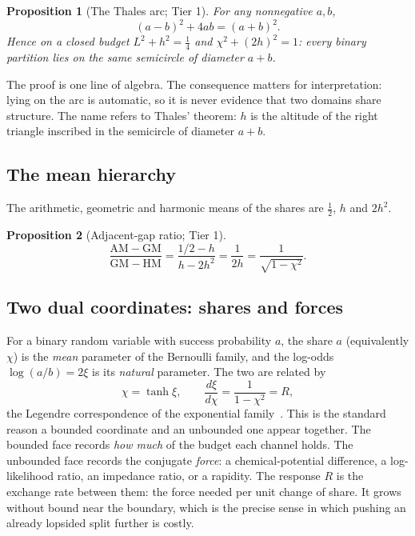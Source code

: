 \documentclass[11pt]{article}
\newtheorem{proposition}{Proposition}
\theoremstyle{definition}
\theoremstyle{remark}
\begin{document}
\begin{proposition}[The Thales arc; Tier 1]\label{prop:arc}
For any nonnegative $a,b$,
\begin{equation}\label{eq:circle}
(a-b)^2+4ab=(a+b)^2 .
\end{equation}
Hence on a closed budget $L^2+h^2=\tfrac14$ and $\chi^2+(2h)^2=1$: every binary partition lies
on the same semicircle of diameter $a+b$.
\end{proposition}

The proof is one line of algebra. The consequence matters for interpretation: lying on the
arc is automatic, so it is never evidence that two domains share structure. The name refers
to Thales' theorem: $h$ is the altitude of the right triangle inscribed in the semicircle of
diameter $a+b$.

\subsection{The mean hierarchy}
The arithmetic, geometric and harmonic means of the shares are $\tfrac12$, $h$ and $2h^2$.

\begin{proposition}[Adjacent-gap ratio; Tier 1]\label{prop:means}
\[
\frac{\mathrm{AM}-\mathrm{GM}}{\mathrm{GM}-\mathrm{HM}}=\frac{1/2-h}{h-2h^2}
=\frac{1}{2h}=\frac{1}{\sqrt{1-\chi^2}} .
\]
\end{proposition}

\subsection{Two dual coordinates: shares and forces}
For a binary random variable with success probability $a$, the share $a$ (equivalently
$\chi$) is the \emph{mean} parameter of the Bernoulli family, and the log-odds
$\log(a/b)=2\xi$ is its \emph{natural} parameter. The two are related by
\begin{equation}\label{eq:legendre}
\chi=\tanh\xi,\qquad \frac{d\xi}{d\chi}=\frac{1}{1-\chi^2}=R,
\end{equation}
the Legendre correspondence of the exponential family~\cite{AmariNagaoka2000}. This is the
standard reason a bounded coordinate and an unbounded one appear together. The bounded face
records \emph{how much} of the budget each channel holds. The unbounded face records the
conjugate \emph{force}: a chemical-potential difference, a log-likelihood ratio, an
impedance ratio, or a rapidity. The response $R$ is the exchange rate between them: the
force needed per unit change of share. It grows without bound near the boundary, which is
the precise sense in which pushing an already lopsided split further is costly.
\end{document}
